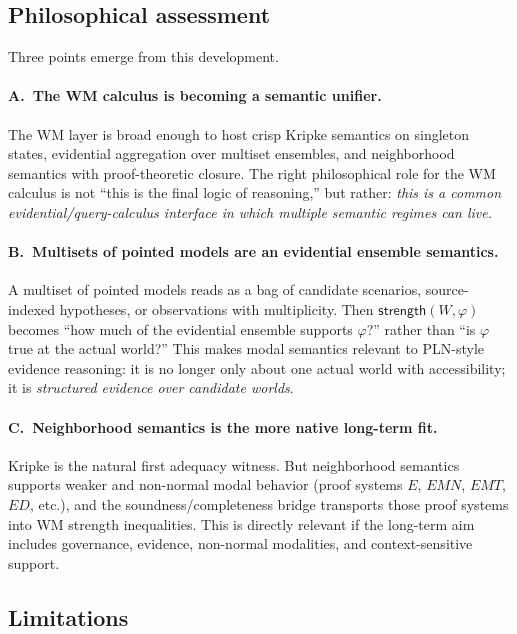 \documentclass[]{article}
\newcommand{\Strength}{\mathsf{strength}}
\begin{document}
\subsection{Philosophical assessment}
\label{sec:modal-philosophy}

Three points emerge from this development.

\paragraph{A.\ The WM calculus is becoming a semantic unifier.}
The WM layer is broad enough to host crisp Kripke semantics on singleton
states, evidential aggregation over multiset ensembles, and neighborhood
semantics with proof-theoretic closure. The right philosophical role for
the WM calculus is not ``this is the final logic of reasoning,'' but
rather: \emph{this is a common evidential/query-calculus interface in
which multiple semantic regimes can live.}

\paragraph{B.\ Multisets of pointed models are an evidential ensemble
semantics.}
A multiset of pointed models reads as a bag of candidate scenarios,
source-indexed hypotheses, or observations with multiplicity. Then
$\Strength(W,\varphi)$ becomes ``how much of the evidential ensemble
supports $\varphi$?'' rather than ``is $\varphi$ true at the actual
world?'' This makes modal semantics relevant to PLN-style evidence
reasoning: it is no longer only about one actual world with
accessibility; it is \emph{structured evidence over candidate worlds}.

\paragraph{C.\ Neighborhood semantics is the more native long-term fit.}
Kripke is the natural first adequacy witness. But neighborhood semantics
supports weaker and non-normal modal behavior (proof systems $E$,
$\mathit{EMN}$, $\mathit{EMT}$, $\mathit{ED}$, etc.), and the
soundness/completeness bridge transports those proof systems into WM
strength inequalities. This is directly relevant if the long-term aim
includes governance, evidence, non-normal modalities, and
context-sensitive support.


\subsection{Limitations}
\label{sec:modal-limits}
\end{document}
